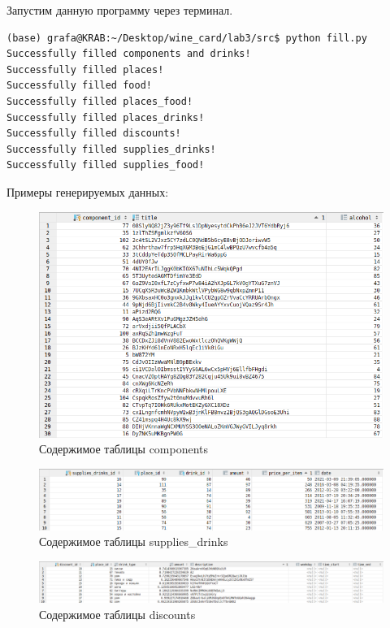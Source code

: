 Запустим данную программу через терминал.

\begin{lstlisting}
(base) grafa@KRAB:~/Desktop/wine_card/lab3/src$ python fill.py
Successfully filled components and drinks!
Successfully filled places!
Successfully filled food!
Successfully filled places_food!
Successfully filled places_drinks!
Successfully filled discounts!
Successfully filled supplies_drinks!
Successfully filled supplies_food!
\end{lstlisting}

Примеры генерируемых данных:

\begin{figure}[H]
	\begin{center}
		\includegraphics[scale=0.3]{./pics/components.png}
		\caption{Содержимое таблицы components} 
		\label{pic:components} %
	\end{center}
\end{figure}

\begin{figure}[H]
	\begin{center}
		\includegraphics[scale=0.5]{./pics/supplies_drinks.png}
		\caption{Содержимое таблицы supplies\_drinks} 
		\label{pic:supplies_drinks} %
	\end{center}
\end{figure}

\begin{figure}[H]
	\begin{center}
		\includegraphics[scale=0.5]{./pics/discounts.png}
		\caption{Содержимое таблицы discounts} 
		\label{pic:discounts} %
	\end{center}
\end{figure}



